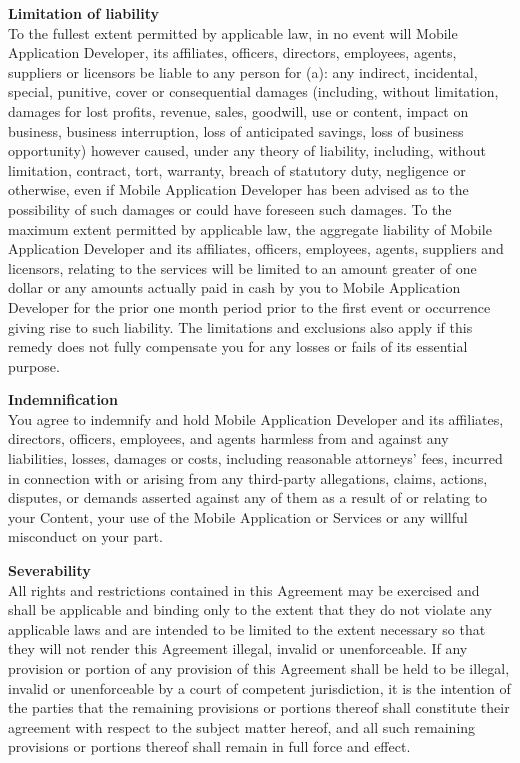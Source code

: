 \documentclass[letterpaper,10pt]{article}
\begin{document}
\begin{appendices}
\large{\textbf{Limitation of liability}} \\
To the fullest extent permitted by applicable law, in no event will Mobile Application Developer, its affiliates, officers, directors, employees, agents, suppliers or licensors be liable to any person for (a): any indirect, incidental, special, punitive, cover or consequential damages (including, without limitation, damages for lost profits, revenue, sales, goodwill, use or content, impact on business, business interruption, loss of anticipated savings, loss of business opportunity) however caused, under any theory of liability, including, without limitation, contract, tort, warranty, breach of statutory duty, negligence or otherwise, even if Mobile Application Developer has been advised as to the possibility of such damages or could have foreseen such damages. To the maximum extent permitted by applicable law, the aggregate liability of Mobile Application Developer and its affiliates, officers, employees, agents, suppliers and licensors, relating to the services will be limited to an amount greater of one dollar or any amounts actually paid in cash by you to Mobile Application Developer for the prior one month period prior to the first event or occurrence giving rise to such liability. The limitations and exclusions also apply if this remedy does not fully compensate you for any losses or fails of its essential purpose.

\large{\textbf{Indemnification}} \\
You agree to indemnify and hold Mobile Application Developer and its affiliates, directors, officers, employees, and agents harmless from and against any liabilities, losses, damages or costs, including reasonable attorneys' fees, incurred in connection with or arising from any third-party allegations, claims, actions, disputes, or demands asserted against any of them as a result of or relating to your Content, your use of the Mobile Application or Services or any willful misconduct on your part.

\large{\textbf{Severability}} \\
All rights and restrictions contained in this Agreement may be exercised and shall be applicable and binding only to the extent that they do not violate any applicable laws and are intended to be limited to the extent necessary so that they will not render this Agreement illegal, invalid or unenforceable. If any provision or portion of any provision of this Agreement shall be held to be illegal, invalid or unenforceable by a court of competent jurisdiction, it is the intention of the parties that the remaining provisions or portions thereof shall constitute their agreement with respect to the subject matter hereof, and all such remaining provisions or portions thereof shall remain in full force and effect.


\end{appendices}
\end{document}
